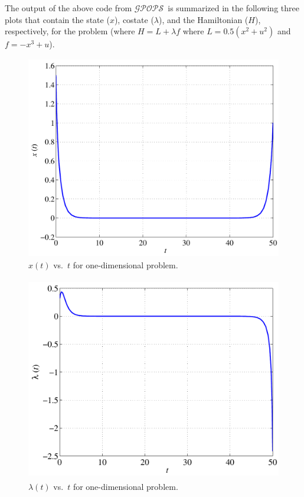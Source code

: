 \documentclass[10pt,final]{report}
\newcommand{\gpops}{$\mathcal{GPOPS}$~}
\begin{document}
\normalsize
The output of the above code from \gpops is summarized in the following three
plots that contain the state ($x$), costate ($\lambda$), and the Hamiltonian
($H$), respectively, for the problem (where $H=L+\lambda f$ where
$L=0.5(x^2+u^2)$ and $f=-x^3+u$).
\begin{figure}[H]
  \centering
  \includegraphics[height=3.5in]{xvst.pdf}
  \caption{$x(t)$ vs.~$t$ for one-dimensional problem.}
\end{figure}
\begin{figure}[H]
  \centering
  \includegraphics[height=3.5in]{lambdavst.pdf}
  \caption{$\lambda(t)$ vs.~$t$ for one-dimensional problem.}
\end{figure}
\end{document}
